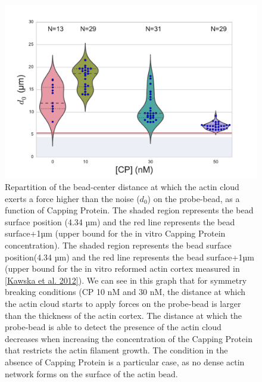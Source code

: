 \documentclass[A4paperpaper,11pt,english]{sphinxmanual}
\begin{document}
\begin{figure}[htbp]
\centering
\capstart

\includegraphics[width=0.650\linewidth]{d0_violin.pdf}
\caption{Repartition of the bead-center distance at which the actin cloud exerts a
force higher than the noise (\(d_0\)) on the probe-bead, as a function of
Capping Protein. The shaded region represents the bead surface position     (4.34 µm) and the red line represents the bead surface+1µm (upper bound for
the in vitro
Capping Protein concentration). The shaded region represents the bead surface position(4.34 µm) and the red line represents the bead surface+1µm
(upper bound for the in vitro
reformed actin cortex measured in {\hyperref[index-latex:kawska2012]{{[}Kawska et al. 2012{]}}}). We can see in this graph that for symmetry breaking
conditions (CP 10 nM and 30 nM, the distance at which the actin cloud starts to apply
forces on the probe-bead is larger than the thickness of the actin
cortex. The distance at which the probe-bead is able to detect the presence
of the actin cloud decreases when increasing the concentration of the Capping
Protein that restricts  the actin filament growth. The condition in the absence
of Capping Protein is a particular case, as no dense actin network forms
on the surface of the actin bead.}\label{index-latex:d0-violin}\end{figure}
\end{document}
